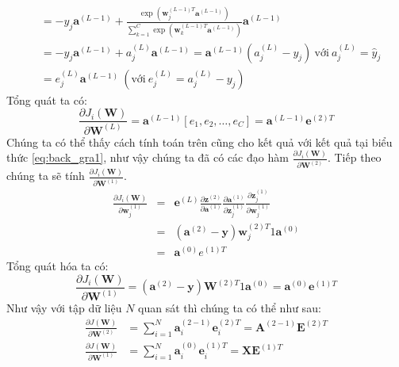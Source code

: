 \begin{enumerate}
\begin{equation*}
\begin{split}
&=-y_{j}\textbf{a}^{(L-1)} + 
\frac{\exp(\textbf{w}_j^{(L-1)T}\textbf{a}^{(L-1)})}{\sum_{k = 1}^C \exp(\textbf{w}_k^{(L-1)T}\textbf{a}^{(L-1)})}\textbf{a}^{(L-1)} \\
&= -y_{j}\textbf{a}^{(L-1)} + a^{(L)}_{j} \textbf{a}^{(L-1)}= \textbf{a}^{(L-1)} (a^{(L)}_{j} - y_{j})~ \text{với} ~a_j^{(L)} = \widehat{y}_j \\
&= e^{(L)}_{j}\textbf{a}^{(L-1)} ~(\text{với}~ e^{(L)}_{j} = a^{(L)}_{j} - y_{j})
\end{split}
\end{equation*} 
Tổng quát ta có:
\begin{equation}
\frac{\partial J_i(\textbf{W})}{\partial \textbf{W}^{(L)}} = \textbf{a}^{(L-1)}[e_1,e_2,\ldots,e_C]=\textbf{a}^{(L-1)}\textbf{e}^{(2)T}
\end{equation}
Chúng ta có thể thấy cách tính toán trên cũng cho kết quả với kết quả tại biểu thức \ref{eq:back_gra1}, như vậy chúng ta đã có các đạo hàm $\frac{\partial J_i(\textbf{W})}{\partial \textbf{W}^{(2)}}$. Tiếp theo chúng ta sẽ tính $\frac{\partial J_i(\textbf{W})}{\partial \textbf{W}^{(1)}}$.
\begin{eqnarray*}
\frac{\partial J_i(\textbf{W})}{\partial \textbf{w}^{(1)}_j} &=& \textbf{e}^{(L)}\frac{\partial\textbf{z}^{(2)}}{\partial \textbf{a}^{(1)}} \frac{\partial \textbf{a}^{(1)}}{\partial \textbf{z}^{(1)}_j} \frac{\partial \textbf{z}^{(1)}_j}{\partial \textbf{w}^{(1)}_j}  \\
&=&(\textbf{a}^{(2)}-\textbf{y})\textbf{w}^{(2)T}_j 1\textbf{a}^{(0)}\\
&=&\textbf{a}^{(0)}e^{(1)T}
\end{eqnarray*}
Tổng quát hóa ta có:
\begin{equation}
\frac{\partial J_i(\textbf{W})}{\partial \textbf{W}^{(1)}} = (\textbf{a}^{(2)}-\textbf{y})\textbf{W}^{(2)T} 1 \textbf{a}^{(0)} = \textbf{a}^{(0)}\textbf{e}^{(1)T}
\end{equation}
Như vậy với tập dữ liệu $N$ quan sát thì chúng ta có thể như sau:
\begin{equation}
\begin{split}
\frac{\partial J(\textbf{W})}{\partial \textbf{W}^{(2)}} &=\sum^{N}_{i=1} \textbf{a}^{(2-1)}_i\textbf{e}^{(2)T}_i = \textbf{A}^{(2-1)}\textbf{E}^{(2)T}\\
\frac{\partial J(\textbf{W})}{\partial \textbf{W}^{(1)}} &= \sum^{N}_{i=1} \textbf{a}^{(0)}_i \textbf{e}^{(1)T}_i = \textbf{X}\textbf{E}^{(1)T}
\end{split}
\end{equation}

\end{enumerate}
